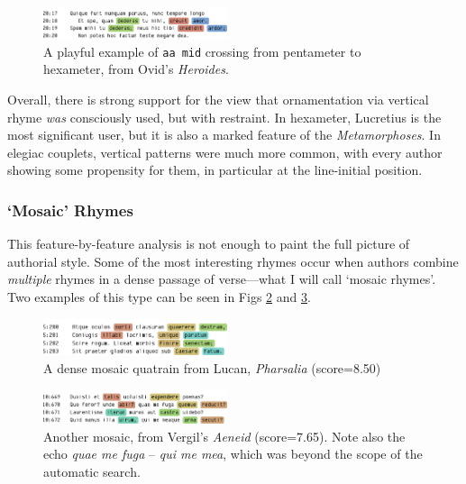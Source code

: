\documentclass[twocolumn, switch]{article} %
\begin{document}
\begin{figure}
    \caption{
      A playful example of \texttt{aa mid} crossing from pentameter to
      hexameter, from Ovid's \emph{Heroides}.
    }
    \label{fig:heroides_pent}
    \centering
    \includegraphics[width=0.48\textwidth]{heroides_pent.pdf}
\end{figure}

Overall, there is strong support for the view that ornamentation via vertical
rhyme \emph{was} consciously used, but with restraint. In hexameter, Lucretius
is the most significant user, but it is also a marked feature of the
\emph{Metamorphoses}. In elegiac couplets, vertical patterns were much more
common, with every author showing some propensity for them, in particular at
the line-initial position. 

\subsubsection{`Mosaic' Rhymes}
\label{sec:mosaic}

This feature-by-feature analysis is not enough to paint the full picture of
authorial style. Some of the most interesting rhymes occur when authors
combine \emph{multiple} rhymes in a dense passage of verse---what I will call
`mosaic rhymes'. Two examples of this type can be seen in Figs
\ref{fig:mosaic_phars} and \ref{fig:mosaic_aen}.

\begin{figure}[h]
    \caption{A dense mosaic quatrain from Lucan, \emph{Pharsalia} (score=8.50)}
    \label{fig:mosaic_phars}
    \centering
    \includegraphics[width=0.48\textwidth]{phar_mosaic.pdf}
\end{figure}

\begin{figure}[h]
    \caption{Another mosaic, from Vergil's \emph{Aeneid} (score=7.65). Note also the echo \emph{quae me fuga} -- \emph{qui me mea}, which was beyond the scope of the automatic search.}
    \label{fig:mosaic_aen}
    \centering
    \includegraphics[width=0.48\textwidth]{aen_mosaic.pdf}
\end{figure}
\end{document}
